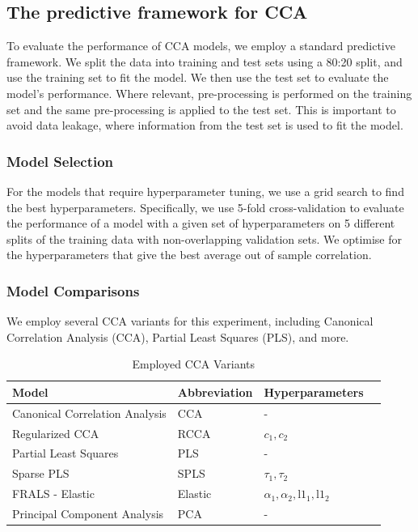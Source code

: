 \subsection{The predictive framework for CCA}\label{subsec:the-predictive-framework-for-cca}

To evaluate the performance of CCA models, we employ a standard predictive framework.
We split the data into training and test sets using a 80:20 split, and use the training set to fit the model.
We then use the test set to evaluate the model's performance.
Where relevant, pre-processing is performed on the training set and the same pre-processing is applied to the test set.
This is important to avoid data leakage, where information from the test set is used to fit the model.

\subsubsection{Model Selection}

For the models that require hyperparameter tuning, we use a grid search to find the best hyperparameters.
Specifically, we use 5-fold cross-validation to evaluate the performance of a model with a given set of hyperparameters on 5 different splits of the training data with non-overlapping validation sets.
We optimise for the hyperparameters that give the best average out of sample correlation.

\subsubsection{Model Comparisons}
We employ several CCA variants for this experiment, including Canonical Correlation Analysis (CCA), Partial Least Squares (PLS), and more.

\begin{table}[h]
\centering
\caption{Employed CCA Variants}
\begin{tabular}{|l|l|l|l|}
\hline
\textbf{Model} & \textbf{Abbreviation} & \textbf{Hyperparameters}  \\
\hline
Canonical Correlation Analysis & CCA & -   \\
\hline
Regularized CCA & RCCA & \(c_1, c_2\)   \\
\hline
Partial Least Squares & PLS & -   \\
\hline
Sparse PLS & SPLS & \(\tau_1, \tau_2\)   \\
\hline
FRALS - Elastic & Elastic & \(\alpha_1, \alpha_2, \text{l1}_1, \text{l1}_2\)   \\
\hline
Principal Component Analysis & PCA & -  \\
\hline
\end{tabular}\label{table:cca-variants}
\end{table}

